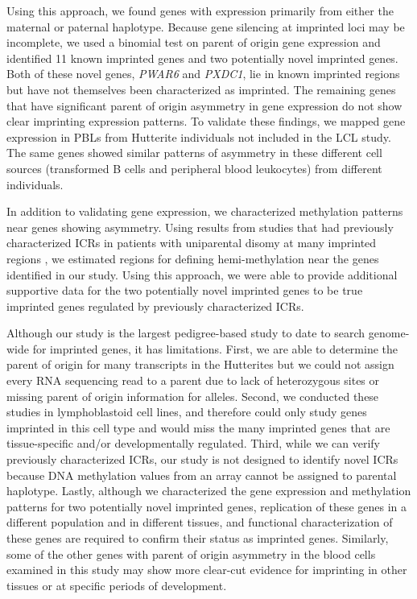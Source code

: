 Using this approach, we found genes with expression primarily from either the maternal or paternal haplotype. Because gene silencing at imprinted loci may be incomplete, we used a binomial test on parent of origin gene expression and identified 11 known imprinted genes and two potentially novel imprinted genes. Both of these novel genes, \emph{PWAR6} and \emph{PXDC1}, lie in known imprinted regions but have not themselves been characterized as imprinted. The remaining genes that have significant parent of origin asymmetry in gene expression do not show clear imprinting expression patterns. To validate these findings, we mapped gene expression in PBLs from Hutterite individuals not included in the LCL study. The same genes showed similar patterns of asymmetry in these different cell sources (transformed B cells and peripheral blood leukocytes) from different individuals.

In addition to validating gene expression, we characterized methylation patterns near genes showing asymmetry. Using results from studies that had previously characterized ICRs in patients with uniparental disomy at many imprinted regions \citep{Joshi:2016bb, Court:2014kc}, we estimated regions for defining hemi-methylation near the genes identified in our study. Using this approach, we were able to provide additional supportive data for the two potentially novel imprinted genes to be true imprinted genes regulated by previously characterized ICRs. 

Although our study is the largest pedigree-based study to date to search genome-wide for imprinted genes, it has limitations. First, we are able to determine the parent of origin for many transcripts in the Hutterites but we could not assign every RNA sequencing read to a parent due to lack of heterozygous sites or missing parent of origin information for alleles. Second, we conducted these studies in lymphoblastoid cell lines, and therefore could only study genes imprinted in this cell type and would miss the many imprinted genes that are tissue-specific and/or developmentally regulated. Third, while we can verify previously characterized ICRs, our study is not designed to identify novel ICRs because DNA methylation values from an array cannot be assigned to parental haplotype. Lastly, although we characterized the gene expression and methylation patterns for two potentially novel imprinted genes, replication of these genes in a different population and in different tissues, and functional characterization of these genes are required to confirm their status as imprinted genes. Similarly, some of the other genes with parent of origin asymmetry in the blood cells examined in this study may show more clear-cut evidence for imprinting in other tissues or at specific periods of development.  

